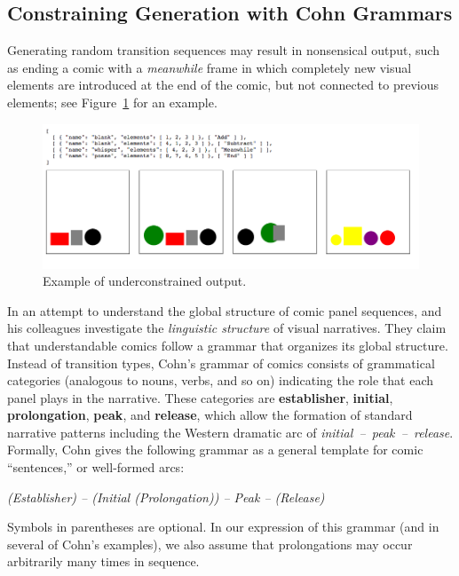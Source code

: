 \subsection{Constraining Generation with Cohn Grammars}
Generating random transition sequences may result in nonsensical output,
such as ending a comic with a \emph{meanwhile} frame in which completely new
visual elements are introduced at the end of the comic, but not connected to 
previous elements; see Figure~\ref{fig:outbad} for an example. 

\begin{figure}
\includegraphics[width=\columnwidth]{comicgen-underconstrained-2.png}
\caption{Example of underconstrained output.}
\label{fig:outbad}
\end{figure}

In an attempt to understand the global structure of comic panel sequences,
 and his colleagues investigate the {\em linguistic structure} of
visual narratives. They claim that understandable comics follow a grammar
that organizes its global structure. Instead of transition types, Cohn's
grammar of comics consists of grammatical categories (analogous to nouns,
verbs, and so on) indicating the role that each panel plays in the
narrative. These categories are {\bf establisher}, {\bf initial}, {\bf
prolongation}, {\bf peak}, and {\bf release}, which allow the formation of
standard narrative patterns including the Western dramatic arc of 
\hbox{\em initial -- peak -- release}. Formally, Cohn gives the following grammar 
as a general template for comic ``sentences,'' or well-formed arcs:

{\it (Establisher) -- (Initial (Prolongation)) -- Peak -- (Release)}

\noindent Symbols in parentheses are optional. In our expression of this grammar (and
in several of Cohn's examples), we also assume that prolongations may occur
arbitrarily many times in sequence.

